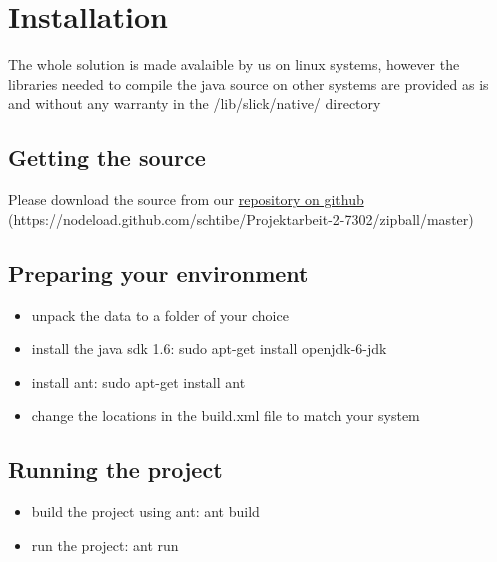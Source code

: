 
\section{Installation}

The whole solution is made avalaible by us on linux systems, however the libraries 
needed to compile the java source on other systems are provided as is 
and without any warranty in the /lib/slick/native/ directory

\subsection{Getting the source}

Please download the source from our \href{https://nodeload.github.com/schtibe/
Projektarbeit-2-7302/zipball/master}{repository on github}
\\(https://nodeload.github.com/schtibe/Projektarbeit-2-7302/zipball/master)

\subsection{Preparing your environment}
\begin{itemize}
\item unpack the data to a folder of your choice
\item install the java sdk 1.6: sudo apt-get install openjdk-6-jdk 
\item install ant: sudo apt-get install ant
\item change the locations in the build.xml file to match your system
\end{itemize}

\subsection{Running the project} 

\begin{itemize}
\item build the project using ant: ant build
\item run the project: ant run
\end{itemize}

